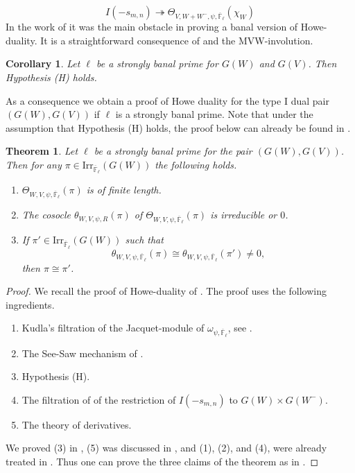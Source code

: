 \documentclass[10pt,a4paper]{article}
\newtheorem{theorem}{Theorem}
\newtheorem{corollary}{Corollary}[section]
\theoremstyle{remark}
\theoremstyle{definition}
\newcommand{\fl}{{\overline{\mathbb{F}}_\ell}}
\newcommand{\irr}{\mathrm{Irr}}
\newcommand{\sra}{\twoheadrightarrow}
\begin{document}
\[I(-s_{m,n})\sra \Theta_{V,W+W^-,\psi,\fl}(\chi_W)\]
In the work of \cite{Trias2025} it was the main obstacle in proving a banal version of Howe-duality.
It is a straightforward consequence of  and the MVW-involution.
\begin{corollary}\label{C:H}
    Let $\ell$ be a strongly banal prime for $G(W)$ and $G(V)$. Then Hypothesis (H) holds.
\end{corollary}
As a consequence we obtain a proof of Howe duality for the type I dual pair $(G(W),G(V))$ if $\ell$ is a strongly banal prime. Note that under the assumption that Hypothesis (H) holds, the proof below can already be found in \cite{Trias2025}.
\begin{theorem}
    Let $\ell$ be a strongly banal prime for the pair $(G(W),G(V))$. Then for any $\pi\in\irr_{\fl}(G(W))$ the following holds.
    \begin{enumerate}
        \item $\Theta_{W,V,\psi,\fl}(\pi)$ is of finite length.
        \item The cosocle $\theta_{W,V,\psi,R}(\pi)$ of $\Theta_{W,V,\psi,\fl}(\pi)$ is irreducible or $0$.
        \item If $\pi'\in\irr_{\fl}(G(W))$ such that \[\theta_{W,V,\psi,\fl}(\pi)\cong \theta_{W,V,\psi,\fl}(\pi')\neq 0,\] then $\pi\cong \pi'$.
    \end{enumerate}
\end{theorem}
\begin{proof}
    We recall the proof of Howe-duality of \cite{GanTakeda2016}. The proof uses the following ingredients.
    \begin{enumerate}
        \item Kudla's filtration of the Jacquet-module of $\omega_{\psi,\fl}$, see \cite{Kudla1986}.
        \item The See-Saw mechanism of \cite[§6.1]{GanIchino2014}.
        \item Hypothesis (H).
        \item The filtration of \cite{KudlaRallis2005} of the restriction of $I(-{s_{m,n}})$ to $G(W)\times G(W^-)$.
        \item The theory of derivatives.
    \end{enumerate}
We proved (3) in , (5) was discussed in , and (1), (2), and (4), were already treated in \cite{Trias2025}.
Thus one can prove the three claims of the theorem as in \cite{GanTakeda2016}.
\end{proof}


\end{document}
